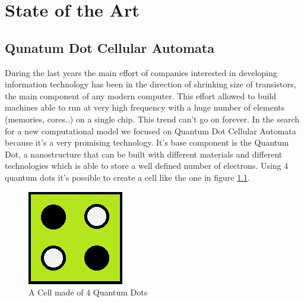 \chapter{State of the Art}\label{sec:state_of_art}
\section{Qunatum Dot Cellular Automata}
During the last years the main effort of companies interested in developing information technology has been in the direction of shrinking size of transistors, the main component of any modern computer. This effort allowed to build machines able to run at very high frequency with a huge number of elements (memories, cores..) on a single chip.  This trend can't go on forever. In the search for a new computational model we focused on Quantum Dot Cellular Automata because it's a very promising technology. It's base component is the Quantum Dot, a nanostructure that can be built with different materials and different technologies which is able to store a well defined number of electrons. Using 4 quantum dots it's possible to create a cell like the one in figure \ref{img:cell}. 

\begin{figure}
\centering
\includegraphics[scale=0.8]{img/_Cell1.png}
\caption{A Cell made of 4 Quantum Dots}
\label{img:cell}
\end{figure}


